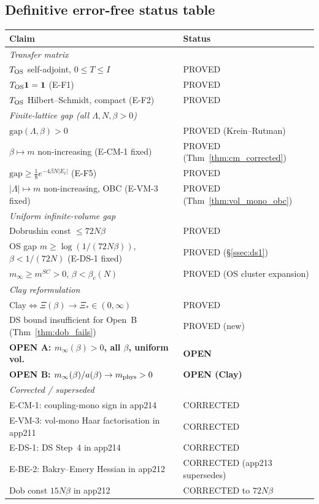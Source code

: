 \subsection{Definitive error-free status table}

\begin{center}
\renewcommand{\arraystretch}{1.12}
\begin{tabular}{p{9.5cm}|l}
\hline
\textbf{Claim} & \textbf{Status}\\
\hline
\multicolumn{2}{l}{\textit{Transfer matrix}}\\
$T_{\rm OS}$ self-adjoint, $0\le T\le I$ & PROVED\\
$T_{\rm OS}\mathbf{1}=\mathbf{1}$ (E-F1) & PROVED\\
$T_{\rm OS}$ Hilbert--Schmidt, compact (E-F2) & PROVED\\
\hline
\multicolumn{2}{l}{\textit{Finite-lattice gap (all $\Lambda,N,\beta>0$)}}\\
$\mathrm{gap}(\Lambda,\beta)>0$ & PROVED (Krein--Rutman)\\
$\beta\mapsto m$ non-increasing (E-CM-1 fixed) & PROVED (Thm~\ref{thm:cm_corrected})\\
$\mathrm{gap}\ge\tfrac{1}{8}e^{-4\beta N|E_t|}$ (E-F5) & PROVED\\
$|\Lambda|\mapsto m$ non-increasing, OBC (E-VM-3 fixed) & PROVED (Thm~\ref{thm:vol_mono_obc})\\
\hline
\multicolumn{2}{l}{\textit{Uniform infinite-volume gap}}\\
Dobrushin const $\le 72N\beta$ & PROVED\\
OS gap $m\ge\log(1/(72N\beta))$, $\beta<1/(72N)$ (E-DS-1 fixed) & PROVED (\S\ref{ssec:ds1})\\
$m_\infty\ge m^{SC}>0$, $\beta<\beta_c(N)$ & PROVED (OS cluster expansion)\\
\hline
\multicolumn{2}{l}{\textit{Clay reformulation}}\\
Clay$\Leftrightarrow\Xi(\beta)\to\Xi_*\in(0,\infty)$ & PROVED\\
DS bound insufficient for Open~B (Thm~\ref{thm:dob_fails}) & PROVED (new)\\
\hline
\textbf{OPEN A: $m_\infty(\beta)>0$, all $\beta$, uniform vol.} & \textbf{OPEN}\\
\textbf{OPEN B: $m_\infty(\beta)/a(\beta)\to m_{\rm phys}>0$} & \textbf{OPEN (Clay)}\\
\hline
\multicolumn{2}{l}{\textit{Corrected / superseded}}\\
E-CM-1: coupling-mono sign in app214 & CORRECTED\\
E-VM-3: vol-mono Haar factorisation in app211 & CORRECTED\\
E-DS-1: DS Step~4 in app214 & CORRECTED\\
E-BE-2: Bakry--Emery Hessian in app212 & CORRECTED (app213 supersedes)\\
Dob const $15N\beta$ in app212 & CORRECTED to $72N\beta$\\
\hline
\end{tabular}
\end{center}

